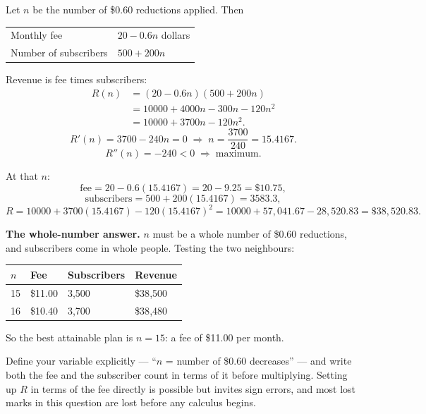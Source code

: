 \begin{solution}
Let $n$ be the number of \$0.60 reductions applied. Then

\begin{center}
\small\sffamily
\begin{tabular}{@{}L{4.6cm} L{7.4cm}@{}}
\toprule
Monthly fee & $20-0.6n$ dollars \\
Number of subscribers & $500+200n$ \\
\bottomrule
\end{tabular}
\end{center}

Revenue is fee times subscribers:
\[
\begin{aligned}
R(n)&=(20-0.6n)(500+200n)\\
&=10000+4000n-300n-120n^{2}\\
&=10000+3700n-120n^{2} .
\end{aligned}
\]
\[
R'(n)=3700-240n=0 \;\Longrightarrow\; n=\frac{3700}{240}=15.4167 .
\]
\[
R''(n)=-240<0 \;\Longrightarrow\;\text{maximum}.
\]

At that $n$:
\[
\text{fee}=20-0.6(15.4167)=20-9.25=\$10.75,
\]
\[
\text{subscribers}=500+200(15.4167)=3583.3,
\]
\[
R=10000+3700(15.4167)-120(15.4167)^{2}
=10000+57{,}041.67-28{,}520.83=\$38{,}520.83 .
\]

\medskip
\textbf{The whole-number answer.} $n$ must be a whole number of \$0.60
reductions, and subscribers come in whole people. Testing the two neighbours:

\begin{center}
\small\sffamily
\begin{tabular}{@{}C{1.6cm} C{2.6cm} C{2.8cm} C{3.0cm}@{}}
\toprule
$n$ & Fee & Subscribers & Revenue \\
 & \$11.00 & 3{,}500 & \$38{,}500 \\
16 & \$10.40 & 3{,}700 & \$38{,}480 \\
\bottomrule
\end{tabular}
\end{center}

So the best attainable plan is $n=15$: a fee of \$11.00 per month.

\end{solution}

\begin{pitfall}
Define your variable explicitly --- ``$n$ = number of \$0.60 decreases'' --- and
write both the fee and the subscriber count in terms of it before multiplying.
Setting up $R$ in terms of the fee directly is possible but invites sign errors,
and most lost marks in this question are lost before any calculus begins.
\end{pitfall}
